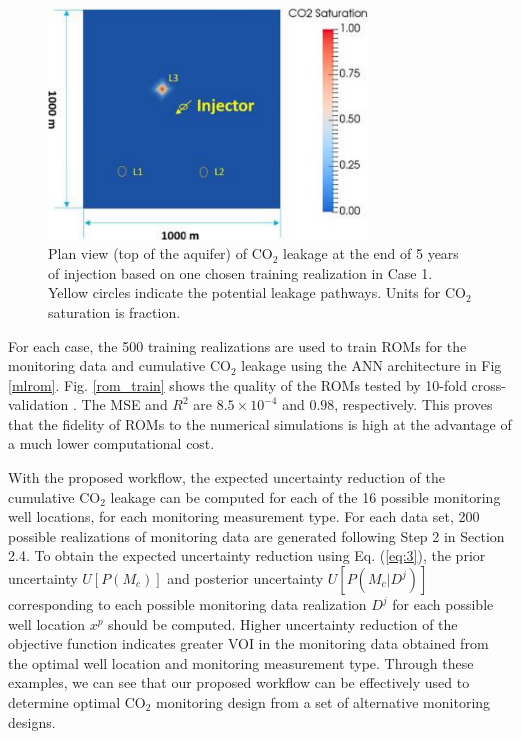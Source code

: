 \documentclass[a4paper,fleqn]{cas-sc}
\begin{document}
\begin{figure}
    \centering
    \includegraphics[width=8.5cm]{figs/Figure 9.pdf}
    \caption{Plan view (top of the aquifer) of CO$_2$ leakage at the end of 5 years of injection based on one chosen training realization in Case 1. Yellow circles indicate the potential leakage pathways. Units for CO$_2$ saturation is fraction.}
    \label{cum_leak_map}
\end{figure}

For each case, the 500 training realizations are used to train ROMs for the monitoring data and cumulative CO$_2$ leakage using the ANN architecture in Fig \ref{mlrom}. Fig. \ref{rom_train} shows the quality of the ROMs tested by 10-fold cross-validation \citep{Geisser1993, Xu2018249}. The MSE and $R^2$ are $8.5\times10^{-4}$ and $0.98$, respectively. This proves that the fidelity of ROMs to the numerical simulations is high at the advantage of a much lower computational cost.

With the proposed workflow, the expected uncertainty reduction of the cumulative CO$_2$ leakage can be computed for each of the 16 possible monitoring well locations, for each monitoring measurement type. For each data set, 200 possible realizations of monitoring data are generated following Step 2 in Section 2.4. To obtain the expected uncertainty reduction using Eq. (\ref{eq:3}), the prior uncertainty $U[P(M_c)]$ and posterior uncertainty $U[P(M_c \vert D^j)]$ corresponding to each possible monitoring data realization $D^j$ for each possible well location $x^p$ should be computed. Higher uncertainty reduction of the objective function indicates greater VOI in the monitoring data obtained from the optimal well location and monitoring measurement type. Through these examples, we can see that our proposed workflow can be effectively used to determine optimal CO$_2$ monitoring design from a set of alternative monitoring designs.
\end{document}
